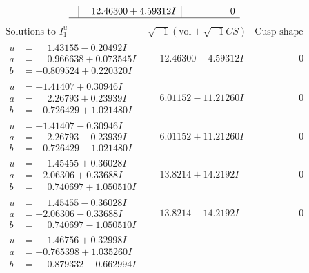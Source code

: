 \documentclass[1p]{elsarticle_modified}
\theoremstyle{definition}
\newcommand{\I}{\sqrt{-1}}
\begin{document}
$$\begin{array}{c|c|c}
 & \phantom{-}12.46300 + 4.59312 I & \phantom{-0.000000 } 0\\
 \hline 
 \end{array}$$\newpage$$\begin{array}{c|c|c}  
\text{Solutions to }I^u_{1}& \I (\text{vol} + \sqrt{-1}CS) & \text{Cusp shape}\\
 \hline 
\begin{aligned}
u &= \phantom{-}1.43155 - 0.20492 I \\
a &= \phantom{-}0.966638 + 0.073545 I \\
b &= -0.809524 + 0.220320 I\end{aligned}
 & \phantom{-}12.46300 - 4.59312 I & \phantom{-0.000000 } 0 \\ \hline\begin{aligned}
u &= -1.41407 + 0.30946 I \\
a &= \phantom{-}2.26793 + 0.23939 I \\
b &= -0.726429 + 1.021480 I\end{aligned}
 & \phantom{-}6.01152 - 11.21260 I & \phantom{-0.000000 } 0 \\ \hline\begin{aligned}
u &= -1.41407 - 0.30946 I \\
a &= \phantom{-}2.26793 - 0.23939 I \\
b &= -0.726429 - 1.021480 I\end{aligned}
 & \phantom{-}6.01152 + 11.21260 I & \phantom{-0.000000 } 0 \\ \hline\begin{aligned}
u &= \phantom{-}1.45455 + 0.36028 I \\
a &= -2.06306 + 0.33688 I \\
b &= \phantom{-}0.740697 + 1.050510 I\end{aligned}
 & \phantom{-}13.8214 + 14.2192 I & \phantom{-0.000000 } 0 \\ \hline\begin{aligned}
u &= \phantom{-}1.45455 - 0.36028 I \\
a &= -2.06306 - 0.33688 I \\
b &= \phantom{-}0.740697 - 1.050510 I\end{aligned}
 & \phantom{-}13.8214 - 14.2192 I & \phantom{-0.000000 } 0 \\ \hline\begin{aligned}
u &= \phantom{-}1.46756 + 0.32998 I \\
a &= -0.765398 + 1.035260 I \\
b &= \phantom{-}0.879332 - 0.662994 I\end{aligned}

\end{array}$$
\end{document}
